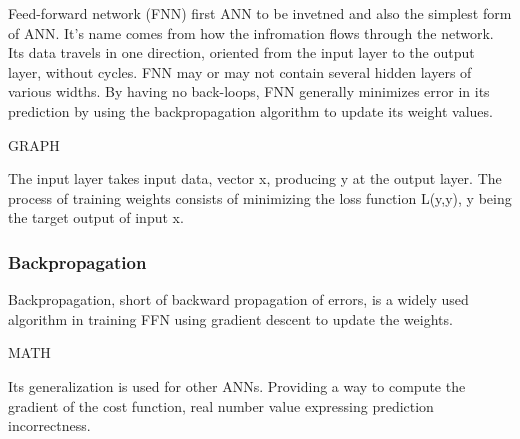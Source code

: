 {\color{red}Feed-forward network (FNN) first ANN to be invetned and also the simplest form of ANN. It's name comes from how the infromation flows through the network. Its data travels in one direction, oriented from the input layer to the output layer, without cycles.\cite{ffnbrilliant} 
}
FNN may or may not contain several hidden layers of various widths. By having no back-loops, FNN generally minimizes error in its prediction by using the backpropagation algorithm to update its weight values.\cite{mainTypesANN}

GRAPH

The input layer takes input data, vector x, producing y at the output layer. The process of training weights
 consists of minimizing the loss function L(y,y), y being the target output of input x.\cite{lipton2015critical}

\subsubsection{Backpropagation}
Backpropagation, short of backward propagation of errors, is a widely used algorithm in training FFN using gradient descent to update the weights. \cite{birlliantbackprop}

MATH

Its generalization is used for other ANNs. Providing a way to compute the gradient of the cost function,
 real number value expressing prediction incorrectness.\cite{Goodfellow-et-al-2016}
